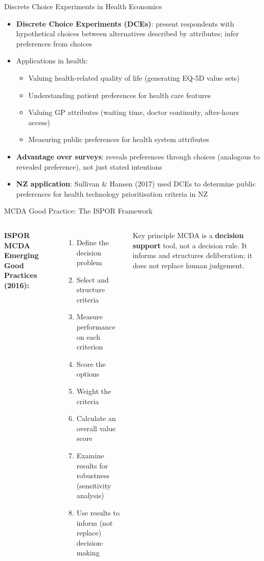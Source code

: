 \documentclass[aspectratio=169, 12pt]{beamer}
\begin{document}
\begin{frame}{Discrete Choice Experiments in Health Economics}
  \begin{itemize}
    \item \textbf{Discrete Choice Experiments (DCEs)}: present respondents with hypothetical
          choices between alternatives described by attributes; infer preferences from choices
    \item Applications in health:
    \begin{itemize}
      \item Valuing health-related quality of life (generating EQ-5D value sets)
      \item Understanding patient preferences for health care features
      \item Valuing GP attributes (waiting time, doctor continuity, after-hours access)
      \item Measuring public preferences for health system attributes
    \end{itemize}
    \item \textbf{Advantage over surveys}: reveals preferences through choices (analogous
          to revealed preference), not just stated intentions
    \item \textbf{NZ application}: Sullivan \& Hansen (2017) used DCEs to determine
          public preferences for health technology prioritisation criteria in NZ
  \end{itemize}
\end{frame}

\begin{frame}{MCDA Good Practice: The ISPOR Framework}
  \begin{columns}
      \small \textbf{ISPOR MCDA Emerging Good Practices (2016):}
      \footnotesize
      \begin{enumerate}
        \item Define the decision problem
        \item Select and structure criteria
        \item Measure performance on each criterion
        \item Score the options
        \item Weight the criteria
        \item Calculate an overall value score
        \item Examine results for robustness (sensitivity analysis)
        \item Use results to inform (not replace) decision-making
      \end{enumerate}
      \begin{alertblock}{Key principle}
        \footnotesize MCDA is a \textbf{decision support} tool, not a decision rule. It informs and
        structures deliberation; it does not replace human judgement.
      \end{alertblock}
  \end{columns}
\end{frame}
\end{document}
